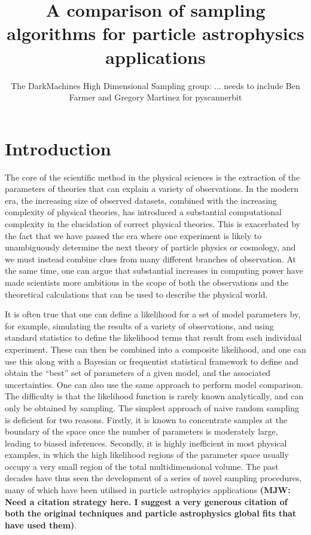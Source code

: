 \documentclass[11pt]{article}
\title{A comparison of sampling algorithms for particle astrophysics applications}
\author{The DarkMachines High Dimensional Sampling group: ... needs to include Ben Farmer and Gregory Martinez for pyscannerbit}
\begin{document}
\section{Introduction}
\maketitle

The core of the scientific method in the physical sciences is the extraction of the parameters of theories that can explain a variety of observations. In the modern era, the increasing size of observed datasets, combined with the increasing complexity of physical theories, has introduced a substantial computational complexity in the elucidation of correct physical theories. This is exacerbated by the fact that we have passed the era where one experiment is likely to unambiguously determine the next theory of particle physics or cosmology, and we must instead combine clues from many different branches of observation. At the same time, one can argue that substantial increases in computing power have made scientists more ambitious in the scope of both the observations and the theoretical calculations that can be used to describe the physical world.

It is often true that one can define a likelihood for a set of model parameters by, for example, simulating the results of a variety of observations, and using standard statistics to define the likelihood terms that result from each individual experiment. These can then be combined into a composite likelihood, and one can use this along with a Bayesian or frequentist statistical framework to define and obtain the ``best'' set of parameters of a given model, and the associated uncertainties. One can also use the same approach to perform model comparison. The difficulty is that the likelihood function is rarely known analytically, and can only be obtained by sampling. The simplest approach of naive random sampling is deficient for two reasons. Firstly, it is known to concentrate samples at the boundary of the space once the number of parameters is moderately large, leading to biased inferences. Secondly, it is highly inefficient in most physical examples, in which the high likelihood regions of the parameter space usually occupy a very small region of the total multidimensional volume. The past decades have thus seen the development of a series of novel sampling procedures, many of which have been utilised in particle astrophyics applications {\bf (MJW: Need a citation strategy here. I suggest a very generous citation of both the original techniques and particle astrophysics global fits that have used them)}. 
\end{document}
